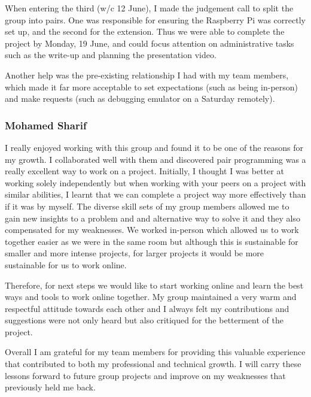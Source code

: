 \documentclass[11pt]{article}
\begin{document}
When entering the third (w/c 12 June), I made the judgement call to split the group into pairs. One was responsible for ensuring the Raspberry Pi was correctly set up, and the second for the extension. Thus we were able to complete the project by Monday, 19 June, and could focus attention on administrative tasks such as the write-up and planning the presentation video. 

Another help was the pre-existing relationship I had with my team members, which made it far more acceptable to set expectations (such as being in-person) and make requests (such as debugging emulator on a Saturday remotely). 


\subsubsection*{Mohamed Sharif}
I really enjoyed working with this group and found it to be one of the reasons for my growth. I collaborated well with them and discovered pair programming was a really excellent way to work on a project. Initially, I thought I was better at working solely independently but when working with your peers on a project with similar abilities, I learnt that we can complete a project way more effectively than if it was by myself. The diverse skill sets of my group members allowed me to gain new insights to a problem and and alternative way to solve it and they also compensated for my weaknesses. We worked in-person which allowed us to work together easier as we were in the same room but although this is sustainable for smaller and more intense projects, for larger projects it would be more sustainable for us to work online. 

Therefore, for next steps we would like to start working online and learn the best ways and tools to work online together. My group maintained a very warm and respectful attitude towards each other and I always felt my contributions and suggestions were not only heard but also critiqued for the betterment of the project.

Overall I am grateful for my team members for providing this valuable experience that contributed to both my professional and technical growth. I will carry these lessons forward to future group projects and improve on my weaknesses that previously held me back.
\end{document}
